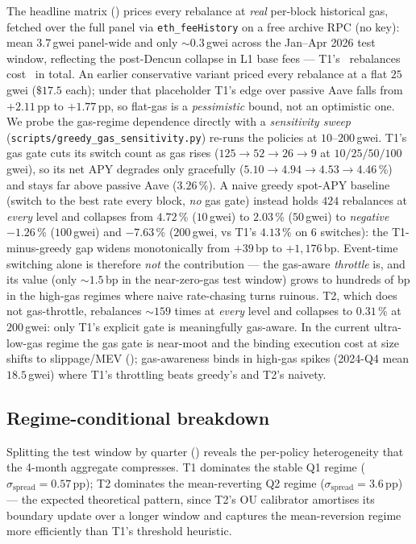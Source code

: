 The headline matrix () prices every rebalance at
\emph{real} per-block historical gas, fetched over the full panel via
\texttt{eth\_feeHistory} on a free archive RPC (no key): mean
$3.7$\,gwei panel-wide and only $\sim 0.3$\,gwei across the Jan--Apr
2026 test window, reflecting the post-Dencun collapse in L1 base fees
--- T1's \TOneNRebal\ rebalances cost \TOneGasUSD\ in total.  An
earlier conservative variant priced every rebalance at a flat
$25$\,gwei ($\$17.5$ each); under that placeholder T1's edge over
passive Aave falls from $+2.11$\,pp to $+1.77$\,pp, so flat-gas is a
\emph{pessimistic} bound, not an optimistic one.  We probe the
gas-regime dependence directly with a \emph{sensitivity sweep}
(\texttt{scripts/greedy\_gas\_sensitivity.py}) re-runs the policies at
$10$--$200$\,gwei.  T1's gas gate cuts its switch count as gas rises
($125\!\to\!52\!\to\!26\!\to\!9$ at $10/25/50/100$\,gwei), so its net
APY degrades only gracefully ($5.10\!\to\!4.94\!\to\!4.53\!\to\!4.46$\,\%)
and stays far above passive Aave ($3.26$\,\%).  A naive greedy
spot-APY baseline (switch to the best rate every block, \emph{no} gas
gate) instead holds $424$ rebalances at \emph{every} level and collapses
from $4.72$\,\% ($10$\,gwei) to $2.03$\,\% ($50$\,gwei) to \emph{negative}
$-1.26$\,\% ($100$\,gwei) and $-7.63$\,\% ($200$\,gwei, vs T1's $4.13$\,\%
on $6$ switches): the T1-minus-greedy gap widens monotonically from
$+39$\,bp to $+1{,}176$\,bp.  Event-time switching alone is therefore \emph{not} the
contribution --- the gas-aware \emph{throttle} is, and its value (only
$\sim 1.5$\,bp in the near-zero-gas test window) grows to hundreds of bp
in the high-gas regimes where naive rate-chasing turns ruinous.  T2,
which does not gas-throttle, rebalances $\sim 159$ times at \emph{every}
level and collapses to $0.31$\,\% at $200$\,gwei: only T1's explicit gate
is meaningfully gas-aware.
In the current ultra-low-gas regime the gas gate is near-moot and the
binding execution cost at size shifts to slippage/MEV
(); gas-awareness binds in high-gas spikes
(2024-Q4 mean $18.5$\,gwei) where T1's throttling beats greedy's and
T2's naivety.

\subsection{Regime-conditional breakdown}
\label{sec:emp-regime}

Splitting the test window by quarter ()
reveals the per-policy heterogeneity that the 4-month aggregate
compresses.  T1 dominates the stable Q1 regime
($\sigma_{\text{spread}} = 0.57$\,pp); T2 dominates the
mean-reverting Q2 regime ($\sigma_{\text{spread}} = 3.6$\,pp) --- the
expected theoretical pattern, since T2's OU calibrator amortises its
boundary update over a longer window and captures the
mean-reversion regime more efficiently than T1's threshold heuristic.

